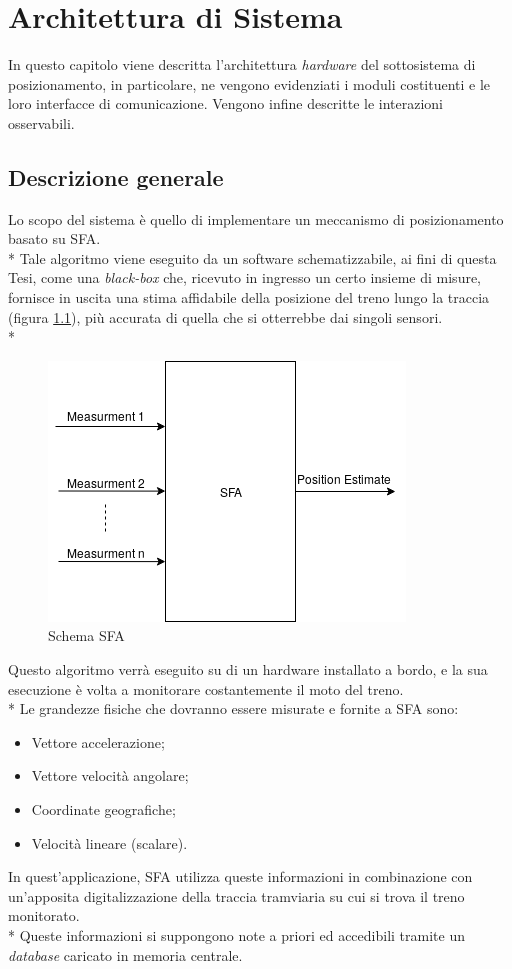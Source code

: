 \chapter{Architettura di Sistema}
In questo capitolo viene descritta l'architettura \emph{hardware} del sottosistema di posizionamento, in particolare, ne vengono evidenziati i moduli costituenti e le loro interfacce di comunicazione. Vengono infine descritte le interazioni osservabili.
\section{Descrizione generale}
Lo scopo del sistema \`e quello di implementare un meccanismo di posizionamento basato su SFA.\\*
Tale algoritmo viene eseguito da un software schematizzabile, ai fini di questa Tesi, come una \emph{black-box}  che, ricevuto in ingresso un certo insieme di misure, fornisce in uscita una stima affidabile della posizione del treno lungo la traccia (figura \ref{fig:sfa}), pi\`u accurata di quella che si otterrebbe dai singoli sensori.\cite{datafuse} \\*
\begin{figure}[h]
	\centering
	\includegraphics[scale=0.7]{img/sfaschema}
	\caption{Schema SFA}
	\label{fig:sfa}
\end{figure}
\clearpage
Questo algoritmo verr\`a eseguito su di un hardware installato a bordo, e la sua esecuzione \`e volta a monitorare costantemente il moto del treno.\\*
Le grandezze fisiche che dovranno essere misurate e fornite a SFA sono:
\begin{itemize}
	\item Vettore accelerazione;
	\item Vettore velocit\`a angolare;
	\item Coordinate geografiche;
	\item Velocit\`a lineare (scalare).
\end{itemize}
In quest'applicazione, SFA utilizza queste informazioni in combinazione con un'apposita digitalizzazione della traccia tramviaria su cui si trova il treno monitorato.\cite{sfaimugps}\cite{sfaimuodo}\cite{sfaimuodogps} \\* Queste informazioni si suppongono note a priori ed accedibili tramite un \emph{database} caricato in memoria centrale. \cite{sqlite3}
